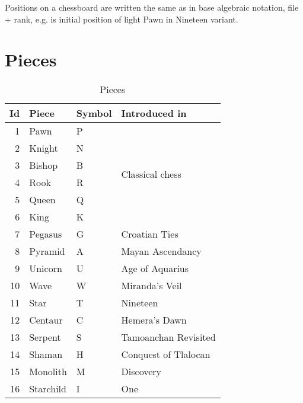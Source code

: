 Positions on a chessboard are written the same as in base algebraic notation, file + rank,
e.g.  is initial position of light Pawn in Nineteen variant.

\clearpage %

\section*{Pieces}
\label{sec:Appendix/Pieces}

\begin{table}[!h]
\centering
\begin{tabular}{ rlll }
\toprule
\textbf{Id} & \textbf{Piece} & \textbf{Symbol} & \textbf{Introduced in}           \\
\midrule
1           & Pawn           & P               & \multirow{6}{*}{Classical chess} \\
2           & Knight         & N               &                                  \\
3           & Bishop         & B               &                                  \\
4           & Rook           & R               &                                  \\
5           & Queen          & Q               &                                  \\
6           & King           & K               &                                  \\ \cmidrule{1-4}
7           & Pegasus        & G               & Croatian Ties                    \\
8           & Pyramid        & A               & Mayan Ascendancy                 \\
9           & Unicorn        & U               & Age of Aquarius                  \\
10          & Wave           & W               & Miranda's Veil                   \\
11          & Star           & T               & Nineteen                         \\
12          & Centaur        & C               & Hemera's Dawn                    \\
13          & Serpent        & S               & Tamoanchan Revisited             \\
14          & Shaman         & H               & Conquest of Tlalocan             \\
15          & Monolith       & M               & Discovery                        \\
16          & Starchild      & I               & One                              \\
\bottomrule
\end{tabular}
\caption{Pieces}
\label{tbl:Appendix/Pieces}
\end{table}

